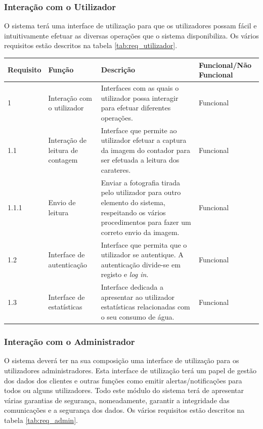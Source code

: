 \subsubsection{Interação com o Utilizador}
O sistema terá uma interface de utilização para que os utilizadores possam fácil e intuitivamente efetuar as diversas operações que o sistema disponibiliza. Os vários requisitos estão descritos na tabela \ref{tab:req_utilizador}.

\begin{center}
\begin{tabular}[c]{||p{1.5cm} | p{3cm} | p{6cm} | p{2.5cm}||} 
\hline
Requisito & Função & Descrição & Funcional/Não Funcional\\ %
\hline\hline
1 & Interação com o utilizador & Interfaces com as quais o utilizador possa interagir para efetuar diferentes operações. & Funcional\\ 
\hline
1.1 & Interação de leitura de contagem & Interface que permite ao utilizador efetuar a captura da imagem do contador para ser efetuada a leitura dos carateres. & Funcional\\
\hline
1.1.1 & Envio de leitura & Enviar a fotografia tirada pelo utilizador para outro elemento do sistema, respeitando os vários procedimentos para fazer um correto envio da imagem. & Funcional\\
\hline
1.2 & Interface de autenticação & 
Interface que permita que o utilizador se autentique. A autenticação divide-se em registo e {\textit{log in}}. & Funcional\\
\hline
1.3 & Interface de estatísticas & 
Interface dedicada a apresentar ao utilizador estatísticas relacionadas com o seu consumo de água. & Funcional\\ %
\hline
\end{tabular}
\label{tab:req_utilizador}
\end{center}

\subsubsection{Interação com o Administrador}
O sistema deverá ter na sua composição uma interface de utilização para os utilizadores administradores. Esta interface de utilização terá um papel de gestão dos dados dos clientes e outras funções como emitir alertas/notificações para todos ou alguns utilizadores.
Todo este módulo do sistema terá de apresentar várias garantias de segurança, nomeadamente, garantir a integridade das comunicações e a segurança dos dados. Os vários requisitos estão descritos na tabela \ref{tab:req_admin}.

